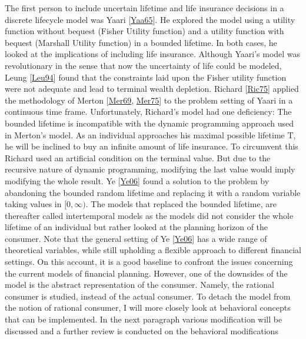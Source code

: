 \documentclass[letterpaper,10pt,english]{jupyterBook}
\begin{document}
The first person to include uncertain lifetime and life insurance decisions in a discrete life\sphinxhyphen{}cycle model was Yaari {[}\hyperlink{cite.Financial_application:id19}{Yaa65}{]}. He explored the model using a utility function without bequest (Fisher Utility function) and a utility function with bequest (Marshall Utility function) in a bounded lifetime. In both cases, he looked at the implications of including life insurance. Although Yaari’s model was revolutionary in the sense that now the uncertainty of life could be modeled, Leung {[}\hyperlink{cite.Financial_application:id23}{Leu94}{]} found that the constraints laid upon the Fisher utility function were not adequate and lead to terminal wealth depletion. Richard {[}\hyperlink{cite.Financial_application:id22}{Ric75}{]} applied the methodology of Merton {[}\hyperlink{cite.Financial_application:id20}{Mer69}, \hyperlink{cite.Financial_application:id21}{Mer75}{]} to the problem setting of Yaari in a continuous time frame. Unfortunately, Richard’s model had one deficiency: The bounded lifetime is incompatible with the dynamic programming approach used in Merton’s model. As an individual approaches his maximal possible lifetime T, he will be inclined to buy an infinite amount of life insurance. To circumvent this Richard used an artificial condition on the terminal value. But due to the recursive nature of dynamic programming, modifying the last value would imply modifying the whole result. Ye {[}\hyperlink{cite.Financial_application:id25}{Ye06}{]}  found a solution to the problem by abandoning the bounded random lifetime and replacing it with a random variable taking values in \([0,\infty)\). The models that replaced the bounded lifetime, are thereafter called intertemporal models as the models did not consider the whole lifetime of an individual but rather looked at the planning horizon of the consumer.  Note that the general setting of Ye {[}\hyperlink{cite.Financial_application:id25}{Ye06}{]} has a wide range of theoretical variables, while still upholding a flexible approach to different financial settings. On this account, it is a good baseline to confront the issues concerning the current models of financial planning. However, one of the downsides of the model is the abstract representation of the consumer. Namely, the rational consumer is studied, instead of the actual consumer. To detach the model from the notion of rational consumer, I will more closely look at behavioral concepts that can be implemented. In the next paragraph various modification will be discussed and a further review is conducted on the behavioral modifications
\end{document}
